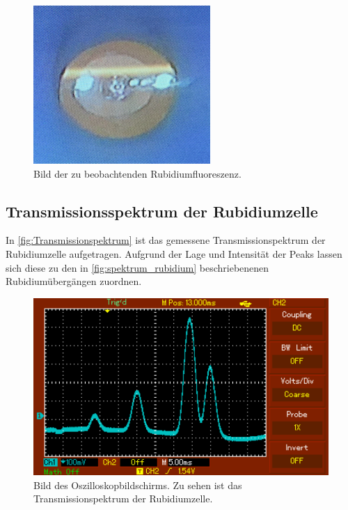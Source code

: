 \begin{figure}
    \centering
    \includegraphics{content/pics/Fluoreszenz.png}
    \caption{Bild der zu beobachtenden Rubidiumfluoreszenz.}
    \label{fig:Rubidiumfluoreszenz}
\end{figure}

\subsection{Transmissionsspektrum der Rubidiumzelle}
In \autoref{fig:Transmissionspektrum} ist das gemessene Transmissionspektrum der Rubidiumzelle aufgetragen. Aufgrund der Lage und Intensität der Peaks
lassen sich diese zu den in \autoref{fig:spektrum_rubidium} beschriebenenen Rubidiumübergängen zuordnen.

\begin{figure}
    \centering
    \includegraphics{content/pics/Peaks.pdf}
    \caption{Bild des Oszilloskopbildschirms. Zu sehen ist das Transmissionspektrum der Rubidiumzelle.}
    \label{fig:Transmissionspektrum}
\end{figure}